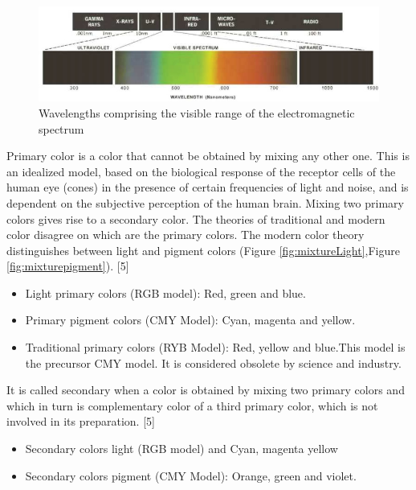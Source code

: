 \begin{figure}
  \includegraphics[width=\linewidth]{images/ch2/wavelength.jpg}
  \caption{Wavelengths comprising the visible range of the electromagnetic spectrum}
  \label{fig:wavelength}
\end{figure}

Primary color is a color that cannot be obtained by mixing any other one. This is an idealized model, based on the biological response of the receptor cells of the human eye (cones) in the presence of certain frequencies of light and noise, and is dependent on the subjective perception of the human brain. Mixing two primary colors gives rise to a secondary color.
The theories of traditional and modern color disagree on which are the primary colors. The modern color theory distinguishes between light and pigment colors (Figure \ref{fig:mixtureLight},Figure \ref{fig:mixturepigment}). [5]

\begin{itemize}
	\item Light primary colors (RGB model): Red, green and blue.
	\item Primary pigment colors (CMY Model): Cyan, magenta and yellow.
	\item Traditional primary colors (RYB Model): Red, yellow and blue.This model is the precursor CMY model. It is considered obsolete by science and industry.
 
\end{itemize}

It is called secondary when a color is obtained by mixing two primary colors and which in turn is complementary color of a third primary color, which is not involved in its preparation. [5]

\begin{itemize}
	\item Secondary colors light (RGB model) and Cyan, magenta yellow
	\item  Secondary colors pigment (CMY Model): Orange, green and violet.
\end{itemize}

